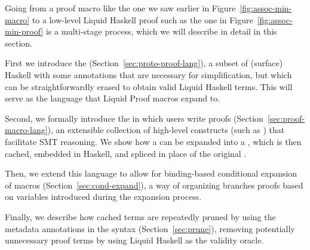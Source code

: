 % 
% 
  

Going from a proof macro like the one we saw earlier in
Figure~\ref{fig:assoc-min-macro} to a low-level Liquid Haskell proof
such as the one in Figure~\ref{fig:assoc-min-proof} is a
multi-stage process, which we will describe in detail in this section.

First we introduce the {\em \LangB}
(Section~\ref{sec:proto-proof-lang}), a subset of (surface) Haskell
with some annotations that are necessary for simplification, but which
can be straightforwardly erased to obtain valid Liquid Haskell terms.
This will serve as the language that Liquid Proof macros expand to.

Second, we formally introduce the {\em \LangA} in which users write
proofs (Section~\ref{sec:proof-macro-lang}), an extensible collection
of high-level constructs (such as ) that facilitate SMT
reasoning. We show how a \LangATerm can be expanded into a \LangBTerm,
which is then cached, embedded in Haskell, and spliced in place of the
original \LangATerm.

Then, we extend this language to allow for binding-based conditional
expansion of macros (Section~\ref{sec:cond-expand}), a way of
organizing branches proofs based on variables introduced during the
expansion process.

Finally, we describe how cached terms are repeatedly pruned by using
the metadata annotations in the \LangB syntax
(Section~\ref{sec:prune}), removing potentially unnecessary proof terms
  by using Liquid Haskell as the validity oracle.


